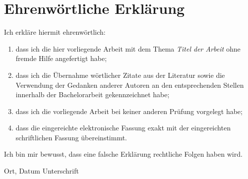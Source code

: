 \clearpage
\chapter*{Ehrenwörtliche Erklärung}	
Ich erkläre hiermit ehrenwörtlich: 

\begin{enumerate}
	\item dass ich die hier vorliegende Arbeit mit dem Thema \textit{Titel der Arbeit} ohne fremde Hilfe angefertigt habe; 
	\item dass ich die Übernahme wörtlicher Zitate aus der Literatur sowie die Verwendung der Gedanken anderer Autoren an den entsprechenden Stellen innerhalb der Bachelorarbeit gekennzeichnet habe;
	\item dass ich die vorliegende Arbeit bei keiner anderen Prüfung vorgelegt habe; 
	\item dass die eingereichte elektronische Fassung exakt mit der eingereichten schriftlichen Fassung übereinstimmt.
\end{enumerate}
Ich bin mir bewusst, dass eine falsche Erklärung rechtliche Folgen haben wird.

\vspace{3cm}
Ort, Datum \hfill Unterschrift 